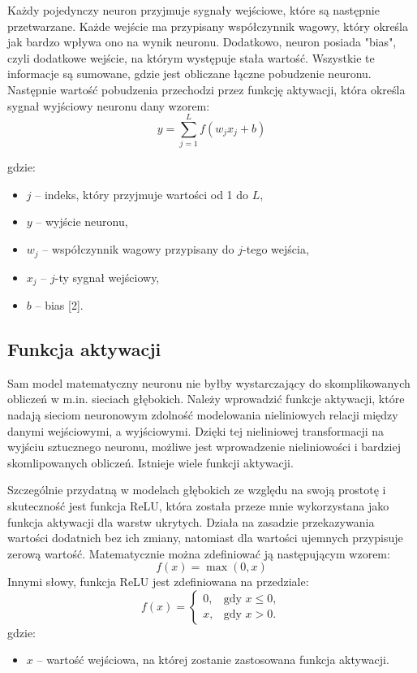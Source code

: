 \documentclass{article}
\begin{document}
Każdy pojedynczy neuron przyjmuje sygnały wejściowe, które są następnie przetwarzane.
Każde wejście ma przypisany współczynnik wagowy, który określa jak bardzo wpływa ono na wynik neuronu.
Dodatkowo, neuron posiada "bias", czyli dodatkowe wejście, na którym występuje stała wartość.
Wszystkie te informacje są sumowane, gdzie jest obliczane łączne pobudzenie neuronu.
Następnie wartość pobudzenia przechodzi przez funkcję aktywacji, która określa sygnał wyjściowy neuronu dany wzorem:
\[
    y = \sum_{j=1}^{L} f(w_{j} x_{j} + b)
\]

gdzie:
\begin{itemize}
    \item $j$ -- indeks, który przyjmuje wartości od 1 do $L$,
    \item $y$ -- wyjście neuronu,
    \item $w_{j}$ -- współczynnik wagowy przypisany do $j$-tego wejścia,
    \item $x_{j}$ -- $j$-ty sygnał wejściowy,
    \item $b$ -- bias [2].
\end{itemize}

\subsection{Funkcja aktywacji}
Sam model matematyczny neuronu nie byłby wystarczający do skomplikowanych obliczeń w m.in. sieciach głębokich.
Należy wprowadzić funkcje aktywacji, które nadają sieciom neuronowym zdolność modelowania nieliniowych relacji między danymi wejściowymi, a wyjściowymi.
Dzięki tej nieliniowej transformacji na wyjściu sztucznego neuronu, możliwe jest wprowadzenie nieliniowości i bardziej skomlipowanych obliczeń.
Istnieje wiele funkcji aktywacji.

Szczególnie przydatną w modelach głębokich ze względu na swoją prostotę i skuteczność jest funkcja ReLU, która została przeze mnie wykorzystana jako funkcja aktywacji dla warstw ukrytych.
Działa na zasadzie przekazywania wartości dodatnich bez ich zmiany, natomiast dla wartości ujemnych przypisuje zerową wartość.
Matematycznie można zdefiniować ją następującym wzorem:
\[
    f(x) = \max(0, x)
\]
Innymi słowy, funkcja ReLU jest zdefiniowana na przedziale:
\[
    f(x) = \begin{cases}
        0, & \text{gdy } x \leq 0, \\
        x, & \text{gdy } x > 0.
    \end{cases}
\]
gdzie:
\begin{itemize}
    \item $x$ -- wartość wejściowa, na której zostanie zastosowana funkcja aktywacji.
\end{itemize}
\end{document}
